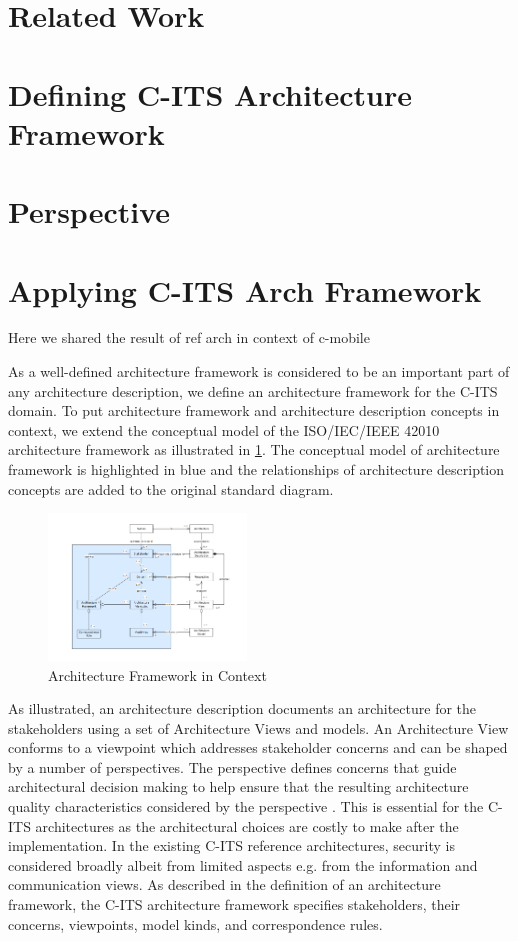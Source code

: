 \documentclass[letterpaper, 10 pt, conference]{ieeeconf}  %
\begin{document}
\section{Related Work}

\section{Defining C-ITS Architecture Framework}

\section{Perspective}

\section{Applying C-ITS Arch Framework}

Here we shared the result of ref arch in context of c-mobile

As a well-defined architecture framework is considered to be an important part of any architecture description\cite{arch_desc}, we define an architecture framework for the C-ITS domain. To put architecture framework and architecture description concepts in context, we extend the conceptual model of the ISO/IEC/IEEE 42010 architecture framework as illustrated in \ref{arch_frmework}. The conceptual model of architecture framework is highlighted in blue and the relationships of architecture description concepts are added to the original standard diagram.

\begin{figure}[ht!]
	\centering
	\includegraphics[width=0.47\textwidth]{arch_framework}
	\caption{Architecture Framework in Context}
	\label{arch_frmework}
	\centering
\end{figure}

As illustrated, an architecture description documents an architecture for the stakeholders using a set of Architecture Views and models. An Architecture View conforms to a viewpoint which addresses stakeholder concerns and can be shaped by a number of perspectives. The perspective defines concerns that guide architectural decision making to help ensure that the resulting architecture quality characteristics considered by the perspective \cite{woods}. This is essential for the C-ITS architectures as the architectural choices are costly to make after the implementation. In the existing C-ITS reference architectures, security is considered broadly albeit from limited aspects e.g. from the information and communication views. As described in the definition of an architecture framework, the C-ITS architecture framework specifies stakeholders, their concerns, viewpoints, model kinds, and correspondence rules.
\end{document}
